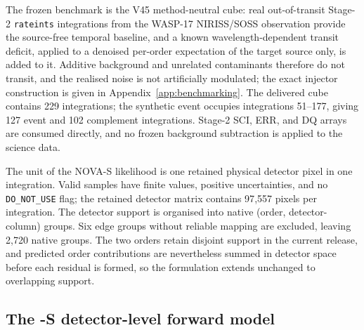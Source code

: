 
The frozen benchmark is the V45 method-neutral cube: real out-of-transit
Stage-2 \texttt{rateints} integrations from the WASP-17 NIRISS/SOSS
observation provide the source-free temporal baseline, and a known
wavelength-dependent transit deficit, applied to a denoised per-order
expectation of the target source only, is added to it. Additive background
and unrelated contaminants therefore do not transit, and the realised noise
is not artificially modulated; the exact injector construction is given in
Appendix~\ref{app:benchmarking}. The delivered cube contains 229
integrations; the synthetic event occupies integrations 51--177, giving 127
event and 102 complement integrations. Stage-2 SCI, ERR, and DQ arrays are
consumed directly, and no frozen background subtraction is applied to the
science data.

The unit of the NOVA-S likelihood is one retained physical detector pixel in
one integration. Valid samples have finite values, positive uncertainties,
and no \texttt{DO\_NOT\_USE} flag; the retained detector matrix contains
97{,}557 pixels per integration. The detector support is organised into
native (order, detector-column) groups. Six edge groups without reliable
mapping are excluded, leaving 2{,}720 native groups. The two orders retain
disjoint support in the current release, and predicted order contributions
are nevertheless summed in detector space before each residual is formed, so
the formulation extends unchanged to overlapping support.

\subsection{The \nova{}-S detector-level forward model}


